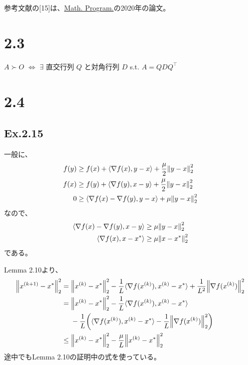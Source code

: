 \documentclass[a4paper, 14pt, dvipdfmx]{extarticle}
\begin{document}
参考文献の[15]は、\href{https://link-springer-com.utokyo.idm.oclc.org/article/10.1007/s10107-019-01406-y}{Math. Program.}の2020年の論文。

\section*{2.3}

$A \succ O$ $\iff$ $\exists$ 直交行列 $Q$ と対角行列 $D$ s.t. $A=QDQ^\top$

\section*{2.4}

\subsection*{Ex.2.15}

一般に、
\begin{align*}
    f(y) & \geq f(x) + \langle \nabla f(x), y-x \rangle + \frac{\mu}{2}\norm{y-x}_2^2 \\
    f(x) & \geq f(y) + \langle \nabla f(y), x-y \rangle + \frac{\mu}{2}\norm{y-x}_2^2 \\
    0    & \geq \langle \nabla f(x)-\nabla f(y), y-x \rangle + \mu \norm{y-x}_2^2
\end{align*}
なので、
\begin{align*}
    \langle \nabla f(x)-\nabla f(y), x-y \rangle & \geq \mu \norm{y-x}_2^2   \\
    \langle \nabla f(x), x-x^* \rangle           & \geq \mu \norm{x-x^*}_2^2
\end{align*}
である。

Lemma 2.10より、
\begin{align*}
    \norm{x^{(k+1)}-x^*}_2^2 ={} & \norm{x^{(k)}-x^*}_2^2 - \frac1L\langle \nabla f(x^{(k)}), x^{(k)}-x^* \rangle + \frac{1}{L^2}\norm{\nabla f(x^{(k)})}_2^2 \\
    ={}                          & \norm{x^{(k)}-x^*}_2^2 - \frac1L\langle \nabla f(x^{(k)}), x^{(k)}-x^* \rangle                                             \\
                                 & -\frac1L\qty(\langle \nabla f(x^{(k)}), x^{(k)}-x^* \rangle - \frac{1}{L}\norm{\nabla f(x^{(k)})}_2^2)                     \\
    \leq{}                       & \norm{x^{(k)}-x^*}_2^2 - \frac{\mu}{L} \norm{x^{(k)}-x^*}_2^2
\end{align*}
途中でもLemma 2.10の証明中の式を使っている。
\end{document}
